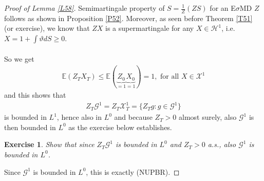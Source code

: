 \documentclass[12pt,a4paper, twoside]{article}
\newtheorem{exe}{Exercise}[section]
\theoremstyle{definition}
\newcommand{\EE}{\mathbb{E}} %
\begin{document}
\begin{proof}[Proof of Lemma \ref{L58}] Semimartingale property of $S=\frac{1}{Z}(ZS)$ for an E$\sigma$MD $Z$ follows as shown in Proposition \ref{P52}. Moreover, as seen before Theorem \ref{T51} (or exercise), we know that $ZX$ is a supermartingale for any $X \in \mathcal{H}^1$, i.e. $X= 1 + \int \vartheta dS \geq 0$. \\
\\
So we get 
\begin{align*}
\EE(Z_TX_T) \leq \EE(\underbrace{Z_0}_{=1}\underbrace{X_0}_{=1})=1, \text{ for all } X \in \mathcal{X}^1
\end{align*}
and this shows that 
\begin{align*}
Z_T\mathcal{G}^1 = Z_T\mathcal{X}_T^1 = \{ Z_T g : g \in \mathcal{G}^1 \}
\end{align*}
is bounded in $L^1$, hence also in $L^0$ and because $Z_T>0$ almost surely, also $\mathcal{G}^1$ is then bounded in $L^0$ as the exercise below establishes.
\begin{exe} Show that since $Z_T \mathcal{G}^1$ is bounded in $L^0$ and $Z_T>0$ a.s., also $\mathcal{G}^1$ is bounded in $L^0$. 
\end{exe}
\noindent Since $\mathcal{G}^1$ is bounded in $L^0$, this is exactly (NUPBR). 
\end{proof}
\newpage
\end{document}
